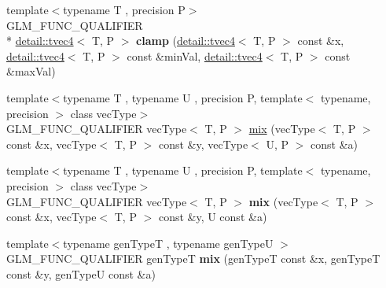 \begin{DoxyCompactItemize}
\item 
\hypertarget{namespaceglm_a0da32315c939ba1df21b2509df74e037}{{\footnotesize template$<$typename T , precision P$>$ }\\G\-L\-M\-\_\-\-F\-U\-N\-C\-\_\-\-Q\-U\-A\-L\-I\-F\-I\-E\-R \\*
\hyperlink{structglm_1_1detail_1_1tvec4}{detail\-::tvec4}$<$ T, P $>$ {\bfseries clamp} (\hyperlink{structglm_1_1detail_1_1tvec4}{detail\-::tvec4}$<$ T, P $>$ const \&x, \hyperlink{structglm_1_1detail_1_1tvec4}{detail\-::tvec4}$<$ T, P $>$ const \&min\-Val, \hyperlink{structglm_1_1detail_1_1tvec4}{detail\-::tvec4}$<$ T, P $>$ const \&max\-Val)}\label{namespaceglm_a0da32315c939ba1df21b2509df74e037}

\item 
{\footnotesize template$<$typename T , typename U , precision P, template$<$ typename, precision $>$ class vec\-Type$>$ }\\G\-L\-M\-\_\-\-F\-U\-N\-C\-\_\-\-Q\-U\-A\-L\-I\-F\-I\-E\-R vec\-Type$<$ T, P $>$ \hyperlink{group__core__func__common_gadccbaffe46f369cf1a96b2aef92cbfdd}{mix} (vec\-Type$<$ T, P $>$ const \&x, vec\-Type$<$ T, P $>$ const \&y, vec\-Type$<$ U, P $>$ const \&a)
\item 
\hypertarget{group__core__func__common_gaa5c83ada94113757c0a555ab4f40cd6e}{{\footnotesize template$<$typename T , typename U , precision P, template$<$ typename, precision $>$ class vec\-Type$>$ }\\G\-L\-M\-\_\-\-F\-U\-N\-C\-\_\-\-Q\-U\-A\-L\-I\-F\-I\-E\-R vec\-Type$<$ T, P $>$ {\bfseries mix} (vec\-Type$<$ T, P $>$ const \&x, vec\-Type$<$ T, P $>$ const \&y, U const \&a)}\label{group__core__func__common_gaa5c83ada94113757c0a555ab4f40cd6e}

\item 
\hypertarget{group__core__func__common_ga78aae7eea618ca112053d59fe03db239}{{\footnotesize template$<$typename gen\-Type\-T , typename gen\-Type\-U $>$ }\\G\-L\-M\-\_\-\-F\-U\-N\-C\-\_\-\-Q\-U\-A\-L\-I\-F\-I\-E\-R gen\-Type\-T {\bfseries mix} (gen\-Type\-T const \&x, gen\-Type\-T const \&y, gen\-Type\-U const \&a)}\label{group__core__func__common_ga78aae7eea618ca112053d59fe03db239}


\end{DoxyCompactItemize}
